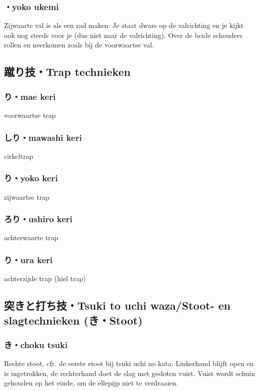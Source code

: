 \subsubsection{・yoko ukemi}
Zijwaarte val is als een rad maken. Je staat dwars op de valrichting en je kijkt ook nog steeds voor je (dus niet naar de valrichting). Over de beide schouders rollen en neerkomen zoals bij de voorwaartse val.

\subsection{蹴り技・Trap technieken}
\subsubsection{り・mae keri}
voorwaartse trap

\subsubsection{しり・mawashi keri}
cirkeltrap

\subsubsection{り・yoko keri} 
zijwaartse trap

\subsubsection{ろり・ushiro keri}
achterwaarte trap   

\subsubsection{り・ura keri}
achterzijde trap (hiel trap)

\subsection{突きと打ち技・Tsuki to uchi waza/Stoot- en slagtechnieken ({\bfseries{}き・Stoot})}
\subsubsection{き・choku tsuki}
Rechte stoot, cfr. de eerste stoot bij tsuki uchi no kata. Linkerhand blijft open en is ingetrokken, de rechterhand doet de slag met gesloten vuist. Vuist wordt schuin gehouden op het einde, om de ellepijp niet te verdraaien.

